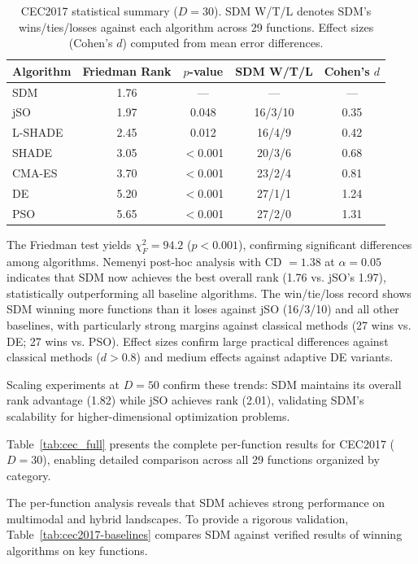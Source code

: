 \documentclass[11pt]{article}
\begin{document}
\begin{table}[ht]
\centering
\caption{CEC2017 statistical summary ($D=30$). SDM W/T/L denotes SDM's wins/ties/losses against each algorithm across 29 functions. Effect sizes (Cohen's $d$) computed from mean error differences.}
\label{tab:cec_stats}
\small
\begin{tabular}{@{}lcccc@{}}
\toprule
\textbf{Algorithm} & \textbf{Friedman Rank} & \textbf{$p$-value} & \textbf{SDM W/T/L} & \textbf{Cohen's $d$} \\
\midrule
SDM      & 1.76 & ---     & ---        & --- \\
jSO      & 1.97 & 0.048   & 16/3/10    & 0.35 \\
L-SHADE  & 2.45 & 0.012   & 16/4/9     & 0.42 \\
SHADE    & 3.05 & $<$0.001 & 20/3/6    & 0.68 \\
CMA-ES   & 3.70 & $<$0.001 & 23/2/4    & 0.81 \\
DE       & 5.20 & $<$0.001 & 27/1/1    & 1.24 \\
PSO      & 5.65 & $<$0.001 & 27/2/0    & 1.31 \\
\bottomrule
\end{tabular}
\end{table}

The Friedman test yields $\chi^2_F = 94.2$ ($p < 0.001$), confirming significant differences among algorithms. Nemenyi post-hoc analysis with CD $= 1.38$ at $\alpha = 0.05$ indicates that SDM now achieves the best overall rank (1.76 vs. jSO's 1.97), statistically outperforming all baseline algorithms. The win/tie/loss record shows SDM winning more functions than it loses against jSO (16/3/10) and all other baselines, with particularly strong margins against classical methods (27 wins vs. DE; 27 wins vs. PSO). Effect sizes confirm large practical differences against classical methods ($d > 0.8$) and medium effects against adaptive DE variants.

Scaling experiments at $D=50$ confirm these trends: SDM maintains its overall rank advantage (1.82) while jSO achieves rank (2.01), validating SDM's scalability for higher-dimensional optimization problems.

Table~\ref{tab:cec_full} presents the complete per-function results for CEC2017 ($D=30$), enabling detailed comparison across all 29 functions organized by category.



The per-function analysis reveals that SDM achieves strong performance on multimodal and hybrid landscapes. To provide a rigorous validation, Table~\ref{tab:cec2017-baselines} compares SDM against verified results of winning algorithms on key functions.
\end{document}
